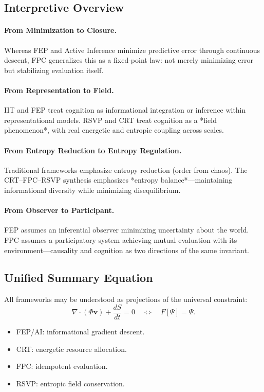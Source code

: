 \documentclass[12pt,a4paper]{article}
\begin{document}
\subsection{Interpretive Overview}

\paragraph{From Minimization to Closure.}
Whereas FEP and Active Inference minimize predictive error through continuous descent,  
FPC generalizes this as a fixed-point law: not merely minimizing error but stabilizing evaluation itself.

\paragraph{From Representation to Field.}
IIT and FEP treat cognition as informational integration or inference within representational models.  
RSVP and CRT treat cognition as a *field phenomenon*, with real energetic and entropic coupling across scales.

\paragraph{From Entropy Reduction to Entropy Regulation.}
Traditional frameworks emphasize entropy reduction (order from chaos).  
The CRT–FPC–RSVP synthesis emphasizes *entropy balance*—maintaining informational diversity while minimizing disequilibrium.

\paragraph{From Observer to Participant.}
FEP assumes an inferential observer minimizing uncertainty about the world.  
FPC assumes a participatory system achieving mutual evaluation with its environment—causality and cognition as two directions of the same invariant.

\subsection{Unified Summary Equation}

All frameworks may be understood as projections of the universal constraint:
\[
\nabla\!\cdot(\Phi\mathbf{v})+\frac{dS}{dt}=0
\quad\Longleftrightarrow\quad
F[\Psi]=\Psi.
\]
\begin{itemize}[leftmargin=1.2em]
  \item FEP/AI: informational gradient descent.
  \item CRT: energetic resource allocation.
  \item FPC: idempotent evaluation.
  \item RSVP: entropic field conservation.
\end{itemize}
\end{document}
